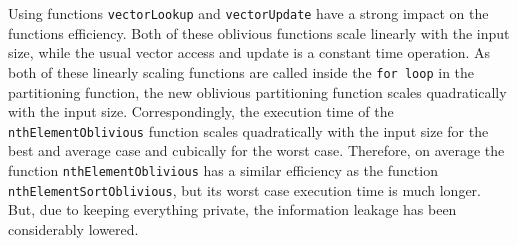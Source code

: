 \documentclass[11pt]{article}
\newcommand{\ct}[1]{\texttt{#1}}
\begin{document}
Using functions \ct{vectorLookup} and \ct{vectorUpdate} have a strong impact on the functions efficiency. Both of these oblivious functions scale linearly with the input size, while the usual vector access and update is a constant time operation. As both of these linearly scaling functions are called inside the \ct{for loop} in the partitioning function, the new oblivious partitioning function scales quadratically with the input size. Correspondingly, the execution time of the \ct{nthElementOblivious} function scales quadratically with the input size for the best and average case and cubically for the worst case. Therefore, on average the function \ct{nthElementOblivious} has a similar efficiency as the function \ct{nthElementSortOblivious}, but its worst case execution time is much longer. But, due to keeping everything private, the information leakage has been considerably lowered. 






% 
\end{document}
